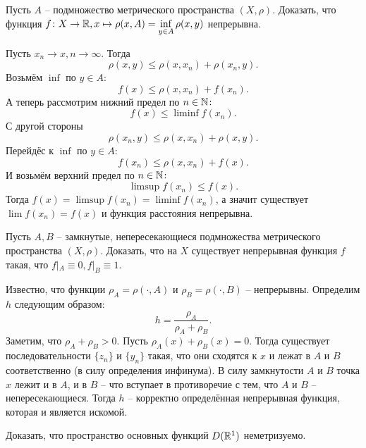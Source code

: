 \begin{task}[\S 1.5]
    Пусть $A$  -- подмножество метрического пространства $(X, \rho)$. Доказать, что функция $f\colon X \to \mathbb{R}, x \mapsto \rho(x, A) = \inf\limits_{y \in A} \rho(x, y)$ непрерывна.
\end{task}
\begin{solve}
    Пусть $x_n \rightarrow x, n \rightarrow \infty$. Тогда
    \[
        \rho(x, y) \leq \rho(x, x_n) + \rho(x_n, y).
    \]
    Возьмём $\inf$ по $y \in A\colon$
    \[
        f(x) \leq \rho(x, x_n) + f(x_n).
    \]
    А теперь рассмотрим нижний предел по $n \in \mathbb{N}\colon$
    \[
        f(x)  \leq \liminf f(x_n).
    \]
    С другой стороны
    \[
        \rho(x_n, y) \leq \rho(x, x_n) + \rho(x, y).
    \]
    Перейдёс к $\inf$ по $y \in A\colon$
    \[
        f(x_n) \leq \rho(x, x_n) + f(x).
    \]
    И возьмём верхний предел по $n \in \mathbb{N}\colon$
    \[
        \limsup f(x_n) \leq f(x).
    \]
    Тогда $f(x) = \limsup f(x_n) = \liminf f(x_n)$, а значит существует $\lim f(x_n) = f(x)$ и функция расстояния непрерывна.
\end{solve}
\begin{task}[\S 1.7]
    Пусть $A, B$  -- замкнутые, непересекающиеся подмножества метрического пространства $(X, \rho)$. Доказать, что на $X$ существует непрерывная функция $f$ такая, что $f|_{A} \equiv 0, f|_{B} \equiv 1$.
\end{task}
\begin{solve}
    Известно, что функции $\rho_A = \rho(\cdot, A)$ и $\rho_B = \rho(\cdot, B)$ -- непрерывны. Определим $h$ следующим образом:
    \[
        h = \frac{\rho_A}{\rho_A + \rho_B}.
    \]
    Заметим, что $\rho_A + \rho_B > 0$. Пусть $\rho_A(x) + \rho_B(x) = 0$. Тогда существует последовательности $\{z_n\}$ и $\{y_n\}$ такая, что они сходятся к $x$ и лежат в $A$ и $B$ соответственно (в силу определения инфинума). В силу замкнутости $A$ и $B$ точка $x$ лежит и в $A$, и в $B$ -- что вступает в противоречие с тем, что $A$ и $B$ -- непересекающиеся.
    Тогда $h$ -- корректно определённая непрерывная функция, которая и является искомой.
\end{solve}
\begin{task}[\S 1.13]
    Доказать, что пространство основных функций $D(\mathbb{R}^1)$ неметризуемо.
\end{task}
